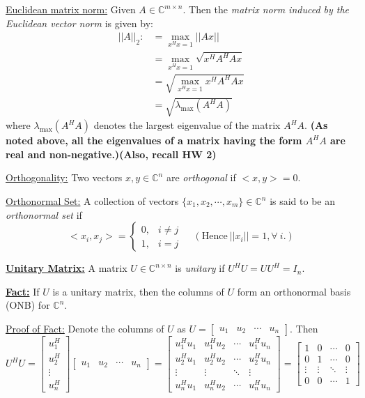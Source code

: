 \documentclass[letterpaper]{article}
\newcommand{\cp}{\mathbb C}    %
\begin{document}
\noindent \underline{Euclidean matrix norm:} Given $A\in \cp^{m\times n}$. Then the \textit{matrix norm induced by the Euclidean vector norm} is given by:
\begin{align}||A||_2:&=\max_{x^Hx = 1} ||Ax|| \\
& = \max_{x^Hx = 1}  \sqrt{x^HA^HAx} \\
& = \sqrt{\max_{x^Hx = 1} x^HA^HAx} \\
&=\sqrt{\lambda_{\text{max}}(A^H A)}\end{align}
where $\lambda_{\text{max}}(A^H A)$ denotes the largest eigenvalue of the matrix $A^H A$. \textbf{(As noted above, all the eigenvalues of a matrix having the form $A^H A$ are real and non-negative.)(Also, recall HW 2)}

\noindent \underline{Orthogonality:} Two vectors $x,y\in \cp^n$ are \textit{orthogonal} if $<x,y>=0$.

\noindent \underline{Orthonormal Set:} A collection of vectors $\{x_1,x_2,\cdots,x_m\}\in \cp^n$ is said to be an \textit{orthonormal set} if
$$<x_i,x_j>=\left\{\begin{array}{ll}
0, & i\not=j\\
1, & i=j
\end{array}\right.~~~~~(\text{Hence}~||x_i||=1, \forall~i.)$$

\noindent \textbf{\underline{Unitary Matrix:}} A matrix $U \in \cp^{n\times n}$ is \textit{unitary} if $U^H U = U U^H=I_n$.

\newpage

\noindent \textbf{\underline{Fact:}} If $U$ is a unitary matrix, then the columns of $U$ form an orthonormal basis (ONB) for $\cp^n$.

\noindent \underline{Proof of Fact:} Denote the columns of $U$ as $U=\begin{bmatrix}u_1 & u_2 & \cdots & u_n \end{bmatrix}$. Then
$$U^H U =\begin{bmatrix}u^H_1 \\[2ex] u^H_2 \\ \vdots \\[2ex] u^H_n \end{bmatrix}\begin{bmatrix}u_1 & u_2 & \cdots & u_n \end{bmatrix}=\left[\begin{array}{cccc} u^H_1 u_1 & u^H_1 u_2 & \cdots & u^H_1 u_n \\[2ex] u^H_2 u_1 & u^H_2 u_2 & \cdots & u^H_2 u_n \\[2ex] \vdots & \vdots &\ddots & \vdots \\[2ex] u^H_n u_1 & u^H_n u_2 & \cdots & u^H_n u_n\end{array}\right]=\left[\begin{array}{cccc} 1 & 0 & \cdots & 0 \\ 0 & 1 & \cdots & 0 \\ \vdots & \vdots &\ddots & \vdots \\ 0 & 0 & \cdots & 1\end{array}\right]$$
\end{document}
